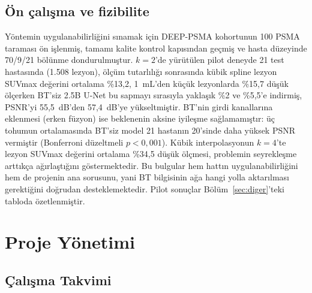 \documentclass[11pt,a4paper]{article}
\begin{document}
\subsection{Ön çalışma ve fizibilite}
Yöntemin uygulanabilirliğini sınamak için DEEP-PSMA kohortunun 100 PSMA taraması ön işlenmiş,
tamamı kalite kontrol kapısından geçmiş ve hasta düzeyinde 70/9/21 bölünme dondurulmuştur.
$k = 2$'de yürütülen pilot deneyde 21 test hastasında (1.508 lezyon), ölçüm tutarlılığı
sonrasında kübik spline lezyon SUVmax değerini ortalama \%13,2, 1~mL'den küçük lezyonlarda
\%15,7 düşük ölçerken BT'siz 2.5B U-Net bu sapmayı sırasıyla yaklaşık \%2 ve \%5,5'e indirmiş,
PSNR'yi 55,5~dB'den 57,4~dB'ye yükseltmiştir. BT'nin girdi kanallarına eklenmesi (erken füzyon)
ise beklenenin aksine iyileşme sağlamamıştır: üç tohumun ortalamasında BT'siz model 21 hastanın
20'sinde daha yüksek PSNR vermiştir (Bonferroni düzeltmeli $p < 0{,}001$). Kübik
interpolasyonun $k = 4$'te lezyon SUVmax değerini ortalama \%34,5 düşük ölçmesi, problemin
seyrekleşme arttıkça ağırlaştığını göstermektedir. Bu bulgular hem hattın uygulanabilirliğini
hem de projenin ana sorusunu, yani BT bilgisinin ağa hangi yolla aktarılması gerektiğini
doğrudan desteklemektedir. Pilot sonuçlar Bölüm~\ref{sec:diger}'teki tabloda özetlenmiştir.

\section{Proje Yönetimi}

\subsection{Çalışma Takvimi}
\end{document}
